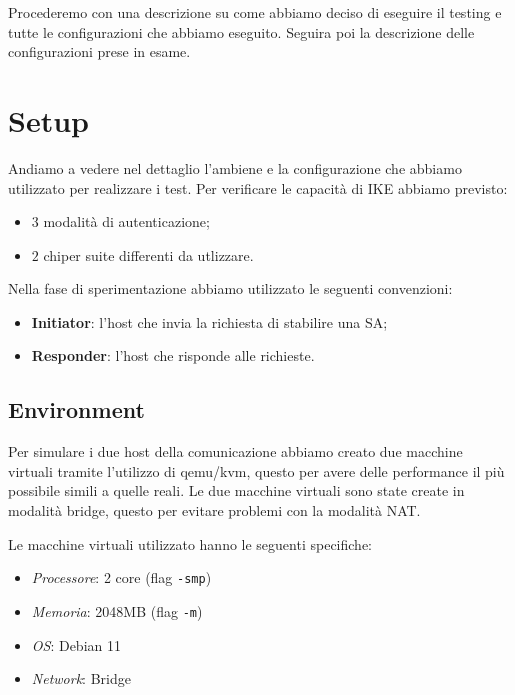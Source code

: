 \documentclass[
10pt, %
a4paper, %
oneside, %
headinclude,footinclude, %
BCOR5mm, %
]{scrartcl}
\begin{document}
\noindent
Procederemo con una descrizione su come abbiamo deciso di eseguire il testing e tutte le configurazioni che abbiamo eseguito.
Seguira poi la descrizione delle configurazioni prese in esame.
\newpage
\section{Setup}

Andiamo a vedere nel dettaglio l'ambiene e la configurazione che abbiamo utilizzato per realizzare i test. Per verificare le capacità di IKE abbiamo previsto:
\begin{itemize}
    \item $3$ modalità di autenticazione;
    \item $2$ chiper suite differenti da utlizzare.
\end{itemize}

\noindent
Nella fase di sperimentazione abbiamo utilizzato le seguenti convenzioni:
\begin{itemize}
    \item \textbf{Initiator}: l'host che invia la richiesta di stabilire una SA;
    \item \textbf{Responder}: l'host che risponde alle richieste.
\end{itemize}


\subsection{Environment}

Per simulare i due host della comunicazione abbiamo creato due macchine virtuali tramite l'utilizzo di qemu/kvm, questo per avere 
delle performance il più possibile simili a quelle reali. Le due macchine virtuali sono state create in modalità bridge, questo per evitare problemi con la modalità NAT.

\noindent
Le macchine virtuali utilizzato hanno le seguenti specifiche:

\begin{itemize}
    \item \textit{Processore}: 2 core (flag \lstinline|-smp|)
    \item \textit{Memoria}: 2048MB (flag \lstinline|-m|)
    \item \textit{OS}: Debian 11
    \item \textit{Network}: Bridge
\end{itemize}
\end{document}

